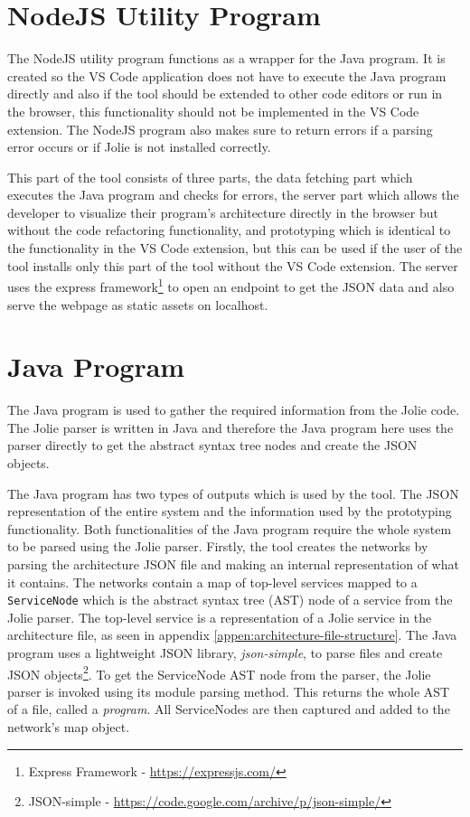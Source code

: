 \section{NodeJS Utility Program}
The NodeJS utility program functions as a wrapper for the Java program. It is created so the VS Code application does not have to execute the Java program directly and also if the tool should be extended to other code editors or run in the browser, this functionality should not be implemented in the VS Code extension.
The NodeJS program also makes sure to return errors if a parsing error occurs or if Jolie is not installed correctly.

This part of the tool consists of three parts, the data fetching part which executes the Java program and checks for errors, the server part which allows the developer to visualize their program's architecture directly in the browser but without the code refactoring functionality, and
prototyping which is identical to the functionality in the VS Code extension, but this can be used if the user of the tool installs only this part of the tool without the VS Code extension.
The server uses the express framework\footnote{Express Framework - \url{https://expressjs.com/}} to open an endpoint to get the JSON data and also serve the webpage as static assets on localhost.

\section{Java Program}
The Java program is used to gather the required information from the Jolie code. The Jolie parser is written in Java and therefore the Java program here uses the parser directly to get the abstract syntax tree nodes and create the JSON objects.

The Java program has two types of outputs which is used by the tool. The JSON representation of the entire system and the information used by the prototyping functionality. Both functionalities of the Java program require the whole system to be parsed using the Jolie parser.
Firstly, the tool creates the networks by parsing the architecture JSON file and making an internal representation of what it contains. The networks contain a map of top-level services mapped to a \texttt{ServiceNode} which is the abstract syntax tree (AST) node of a service from the Jolie parser. The top-level service is a representation of a Jolie service in the architecture file, as seen in appendix \ref*{appen:architecture-file-structure}.
The Java program uses a lightweight JSON library, \textit{json-simple}, to parse files and create JSON objects\footnote{JSON-simple - \url{https://code.google.com/archive/p/json-simple/}}.
To get the ServiceNode AST node from the parser, the Jolie parser is invoked using its module parsing method. This returns the whole AST of a file, called a \textit{program}. All ServiceNodes are then captured and added to the network's map object.


